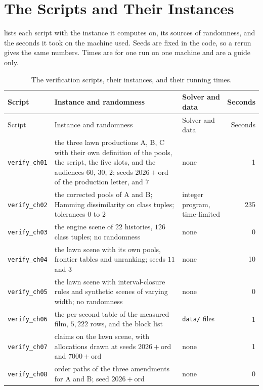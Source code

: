 \documentclass[11pt,twoside,openright]{book}
\theoremstyle{plain}
\theoremstyle{definition}
\theoremstyle{remark}
\begin{document}
\section{The Scripts and Their Instances}\label{sec:instances}

 lists each script with the instance it computes on, its sources of randomness, and the seconds it took on the machine used. Seeds are fixed in the code, so a rerun gives the same numbers. Times are for one run on one machine and are a guide only.

\begin{longtable}{@{}>{\raggedright\arraybackslash}p{2.6cm}>{\raggedright\arraybackslash}p{6.0cm}>{\raggedright\arraybackslash}p{2.4cm}r@{}}
\caption{The verification scripts, their instances, and their running times.}\label{tab:scripts}\\
\toprule
Script & Instance and randomness & Solver and data & Seconds\\
\midrule
\endfirsthead
\toprule
Script & Instance and randomness & Solver and data & Seconds\\
\midrule
\endhead
\bottomrule
\endfoot
\texttt{verify\_ch01} & the three lawn productions A, B, C with their own definition of the pools, the script, the five slots, and the audiences $60$, $30$, $2$; seeds $2026+\mathrm{ord}$ of the production letter, and $7$ & none & 1\\
\texttt{verify\_ch02} & the corrected pools of A and B; Hamming dissimilarity on class tuples; tolerances $0$ to $2$ & integer program, time-limited & 235\\
\texttt{verify\_ch03} & the engine scene of $22$ histories, $126$ class tuples; no randomness & none & 0\\
\texttt{verify\_ch04} & the lawn scene with its own pools, frontier tables and unranking; seeds $11$ and $3$ & none & 10\\
\texttt{verify\_ch05} & the lawn scene with interval-closure rules and synthetic scenes of varying width; no randomness & none & 0\\
\texttt{verify\_ch06} & the per-second table of the measured film, $5{,}222$ rows, and the block list & \texttt{data/} files & 1\\
\texttt{verify\_ch07} & claims on the lawn scene, with allocations drawn at seeds $2026+\mathrm{ord}$ and $7000+\mathrm{ord}$ & none & 1\\
\texttt{verify\_ch08} & order paths of the three amendments for A and B; seed $2026+\mathrm{ord}$ & none & 0\\

\end{longtable}
\end{document}
